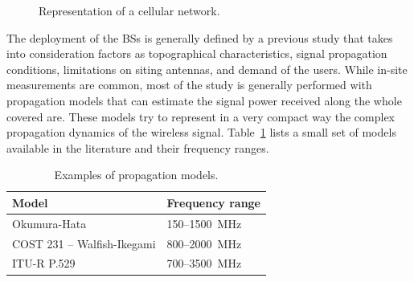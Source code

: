 \begin{figure}[htb]
\centering
    \hfil
    \caption{Representation of a cellular network.}
\label{fig:cell_net}
\end{figure}

The deployment of the BSs is generally defined by a previous study that takes into consideration factors as topographical characteristics, signal propagation conditions, limitations on siting antennas, and demand of the users. While in-site measurements are common, most of the study is generally performed with propagation models that can estimate the signal power received along the whole covered are. These models try to represent in a very compact way the complex propagation dynamics of the wireless signal. Table~\ref{tab:prop_models} lists a small set of models available in the literature and their frequency ranges.

\begin{table}[htb]
\centering
\begin{tabular}{ll}
\hline
\textbf{Model} & \textbf{Frequency range}  \\
\hline
Okumura-Hata & 150--1500~MHz\\
COST 231 -- Walfish-Ikegami & 800--2000~MHz\\ 
ITU-R P.529 & 700--3500~MHz \\ \hline
\end{tabular} 
\caption{Examples of propagation models.}
\label{tab:prop_models}
\end{table}

